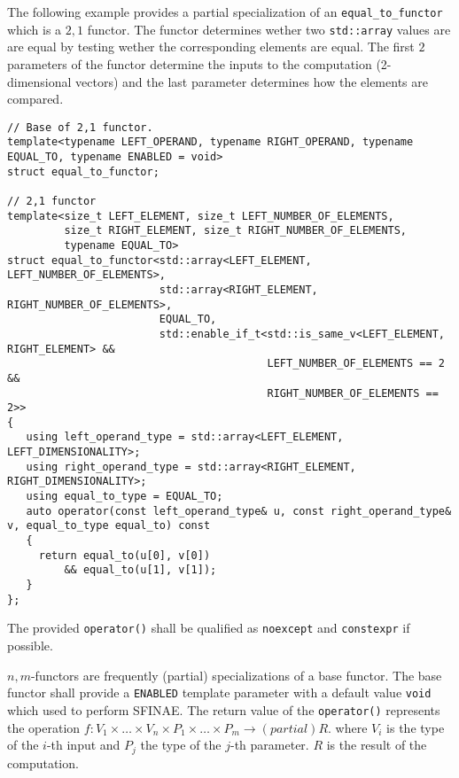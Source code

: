 \noindent{}The following example provides a partial specialization of an \texttt{equal\_to\_functor} which is a $2,1$ functor.
The functor determines wether two \texttt{std::array} values are are equal by testing wether the corresponding elements
are equal. The first $2$ parameters of the functor determine the inputs to the computation (2-dimensional vectors) and
the last parameter determines how the elements are compared.
\begin{verbatim}
// Base of 2,1 functor.
template<typename LEFT_OPERAND, typename RIGHT_OPERAND, typename EQUAL_TO, typename ENABLED = void>
struct equal_to_functor;

// 2,1 functor
template<size_t LEFT_ELEMENT, size_t LEFT_NUMBER_OF_ELEMENTS,
         size_t RIGHT_ELEMENT, size_t RIGHT_NUMBER_OF_ELEMENTS,
         typename EQUAL_TO>
struct equal_to_functor<std::array<LEFT_ELEMENT, LEFT_NUMBER_OF_ELEMENTS>,
                        std::array<RIGHT_ELEMENT, RIGHT_NUMBER_OF_ELEMENTS>,
                        EQUAL_TO,
                        std::enable_if_t<std::is_same_v<LEFT_ELEMENT, RIGHT_ELEMENT> &&
                                         LEFT_NUMBER_OF_ELEMENTS == 2                &&
                                         RIGHT_NUMBER_OF_ELEMENTS == 2>>
{
   using left_operand_type = std::array<LEFT_ELEMENT, LEFT_DIMENSIONALITY>;
   using right_operand_type = std::array<RIGHT_ELEMENT, RIGHT_DIMENSIONALITY>;
   using equal_to_type = EQUAL_TO;
   auto operator(const left_operand_type& u, const right_operand_type& v, equal_to_type equal_to) const
   {
     return equal_to(u[0], v[0])
         && equal_to(u[1], v[1]);
   }
};
\end{verbatim}

\noindent{}The provided \texttt{operator()} shall be qualified as \texttt{noexcept} and \texttt{constexpr} if possible.\newline

\noindent{}$n,m$-functors are frequently (partial) specializations of a base functor.
The base functor shall provide a \texttt{ENABLED} template parameter with a default value \texttt{void} which used to perform SFINAE.
\noindent{}The return value of the \texttt{operator()} represents                the operation
$f : V_1 \times \ldots \times V_n \times P_1 \times \ldots \times P_m \rightarrow(partial) R$.
where $V_i$ is the type of the $i$-th input and $P_j$ the type of the $j$-th parameter. $R$ is
the result of the computation.

